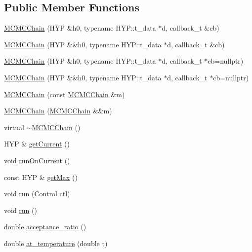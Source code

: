 \subsection*{Public Member Functions}
\begin{DoxyCompactItemize}
\item 
\hyperlink{class_m_c_m_c_chain_a60b036bec195eaa5a8081b2b8cc18eed}{M\+C\+M\+C\+Chain} (H\+YP \&h0, typename H\+Y\+P\+::t\+\_\+data $\ast$d, callback\+\_\+t \&cb)
\item 
\hyperlink{class_m_c_m_c_chain_ac75dc993bdc19b193ef6f128d62f8208}{M\+C\+M\+C\+Chain} (H\+YP \&\&h0, typename H\+Y\+P\+::t\+\_\+data $\ast$d, callback\+\_\+t \&cb)
\item 
\hyperlink{class_m_c_m_c_chain_a60ef818850d6836a21169d6e9bc14221}{M\+C\+M\+C\+Chain} (H\+YP \&h0, typename H\+Y\+P\+::t\+\_\+data $\ast$d, callback\+\_\+t $\ast$cb=nullptr)
\item 
\hyperlink{class_m_c_m_c_chain_a02d18b967945d40689cbe327bfd453e3}{M\+C\+M\+C\+Chain} (H\+YP \&\&h0, typename H\+Y\+P\+::t\+\_\+data $\ast$d, callback\+\_\+t $\ast$cb=nullptr)
\item 
\hyperlink{class_m_c_m_c_chain_a3942ff362dcc0bdfdad296f95048f14e}{M\+C\+M\+C\+Chain} (const \hyperlink{class_m_c_m_c_chain}{M\+C\+M\+C\+Chain} \&m)
\item 
\hyperlink{class_m_c_m_c_chain_a2db84c6b92af066b34eedd257d800417}{M\+C\+M\+C\+Chain} (\hyperlink{class_m_c_m_c_chain}{M\+C\+M\+C\+Chain} \&\&m)
\item 
virtual \hyperlink{class_m_c_m_c_chain_ad19438dd99bdba43b5175705e2bef156}{$\sim$\+M\+C\+M\+C\+Chain} ()
\item 
H\+YP \& \hyperlink{class_m_c_m_c_chain_ae76c66b5bcbc02df926e5f9a91acff17}{get\+Current} ()
\item 
void \hyperlink{class_m_c_m_c_chain_a4214114e0ef4adcd4badfe1440693190}{run\+On\+Current} ()
\item 
const H\+YP \& \hyperlink{class_m_c_m_c_chain_aa5c2bf3cae9a5959cab43e04b1201ed2}{get\+Max} ()
\item 
void \hyperlink{class_m_c_m_c_chain_aef30134b1915b8b494040771480d6b80}{run} (\hyperlink{struct_control}{Control} ctl)
\item 
void \hyperlink{class_m_c_m_c_chain_ae59e07a79da1bf56b01429efcb9fb312}{run} ()
\item 
double \hyperlink{class_m_c_m_c_chain_a4b2b8b51e5ba868bca024f2be737e4c6}{acceptance\+\_\+ratio} ()
\item 
double \hyperlink{class_m_c_m_c_chain_a9adc3d08662ad7035cc9d9d75a1fc5a6}{at\+\_\+temperature} (double t)
\end{DoxyCompactItemize}
